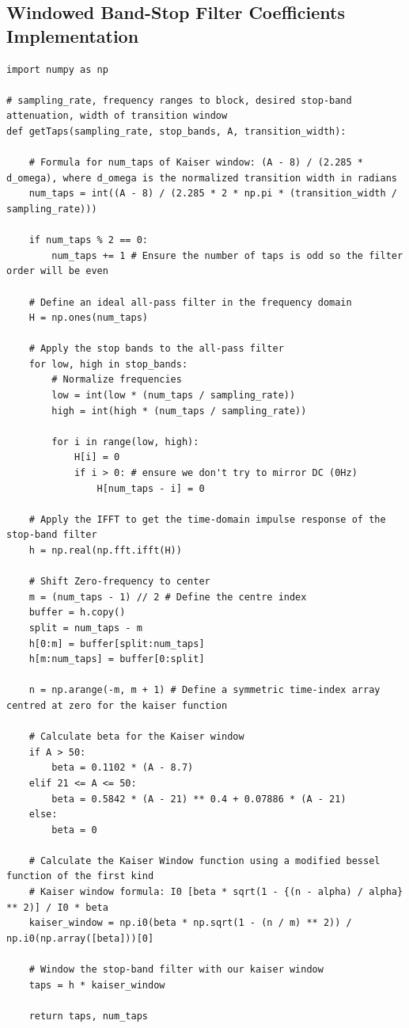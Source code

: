 \documentclass[8pt]{extarticle}
\begin{document}
\subsection{Windowed Band-Stop Filter Coefficients Implementation}
\begin{verbatim}
import numpy as np

# sampling_rate, frequency ranges to block, desired stop-band attenuation, width of transition window
def getTaps(sampling_rate, stop_bands, A, transition_width):

    # Formula for num_taps of Kaiser window: (A - 8) / (2.285 * d_omega), where d_omega is the normalized transition width in radians
    num_taps = int((A - 8) / (2.285 * 2 * np.pi * (transition_width / sampling_rate)))

    if num_taps % 2 == 0:
        num_taps += 1 # Ensure the number of taps is odd so the filter order will be even

    # Define an ideal all-pass filter in the frequency domain
    H = np.ones(num_taps)

    # Apply the stop bands to the all-pass filter
    for low, high in stop_bands:
        # Normalize frequencies
        low = int(low * (num_taps / sampling_rate))
        high = int(high * (num_taps / sampling_rate))

        for i in range(low, high):
            H[i] = 0
            if i > 0: # ensure we don't try to mirror DC (0Hz)
                H[num_taps - i] = 0

    # Apply the IFFT to get the time-domain impulse response of the stop-band filter
    h = np.real(np.fft.ifft(H))

    # Shift Zero-frequency to center
    m = (num_taps - 1) // 2 # Define the centre index
    buffer = h.copy()
    split = num_taps - m
    h[0:m] = buffer[split:num_taps]
    h[m:num_taps] = buffer[0:split]

    n = np.arange(-m, m + 1) # Define a symmetric time-index array centred at zero for the kaiser function

    # Calculate beta for the Kaiser window
    if A > 50:
        beta = 0.1102 * (A - 8.7)
    elif 21 <= A <= 50:
        beta = 0.5842 * (A - 21) ** 0.4 + 0.07886 * (A - 21)
    else:
        beta = 0

    # Calculate the Kaiser Window function using a modified bessel function of the first kind
    # Kaiser window formula: I0 [beta * sqrt(1 - {(n - alpha) / alpha} ** 2)] / I0 * beta
    kaiser_window = np.i0(beta * np.sqrt(1 - (n / m) ** 2)) / np.i0(np.array([beta]))[0]

    # Window the stop-band filter with our kaiser window
    taps = h * kaiser_window

    return taps, num_taps
\end{verbatim}
\end{document}
